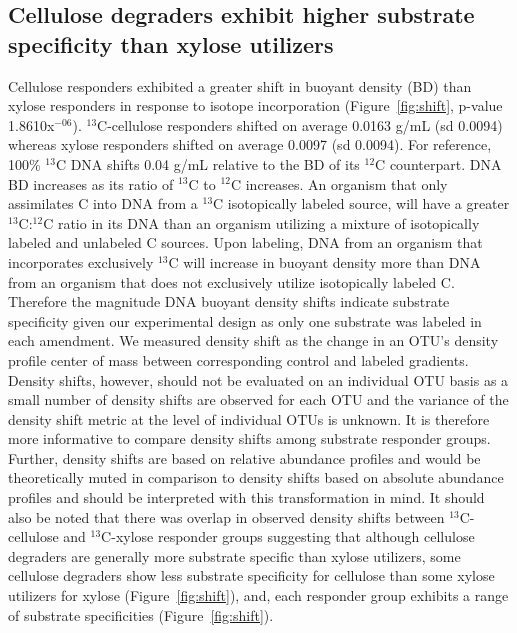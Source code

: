 \subsection{Cellulose degraders exhibit higher substrate specificity than xylose
utilizers} 
Cellulose responders exhibited a greater shift in buoyant density (BD) than xylose
responders in response to isotope incorporation (Figure~\ref{fig:shift},
p-value 1.8610x$^{-06}$). $^{13}$C-cellulose responders shifted on average 0.0163
g/mL (sd 0.0094) whereas xylose responders shifted on average 0.0097 (sd
0.0094). For reference, 100\% $^{13}$C DNA shifts 0.04 g/mL relative to the BD
of its $^{12}$C counterpart. DNA BD increases as its ratio of $^{13}$C to
$^{12}$C increases. An organism that only assimilates C into DNA from a
$^{13}$C isotopically labeled source, will have a greater $^{13}$C:$^{12}$C
ratio in its DNA than an organism utilizing a mixture of isotopically labeled
and unlabeled C sources. Upon labeling, DNA from an organism that incorporates
exclusively $^{13}$C will increase in buoyant density more than DNA from an
organism that does not exclusively utilize isotopically labeled C. Therefore
the magnitude DNA buoyant density shifts indicate substrate specificity given
our experimental design as only one substrate was labeled in each amendment. We
measured density shift as the change in an OTU's density profile center of mass
between corresponding control and labeled gradients. Density shifts, however,
should not be evaluated on an individual OTU basis as a small number of density
shifts are observed for each OTU and the variance of the density shift metric
at the level of individual OTUs is unknown. It is therefore more informative to
compare density shifts among substrate responder groups. Further, density
shifts are based on relative abundance profiles and would be theoretically
muted in comparison to density shifts based on absolute abundance profiles and
should be interpreted with this transformation in mind. It should also be noted
that there was overlap in observed density shifts between $^{13}$C-cellulose
and $^{13}$C-xylose responder groups suggesting that although cellulose
degraders are generally more substrate specific than xylose utilizers, some
cellulose degraders show less substrate specificity for cellulose than some
xylose utilizers for xylose (Figure~\ref{fig:shift}), and, each responder group
exhibits a range of substrate specificities (Figure~\ref{fig:shift}).
